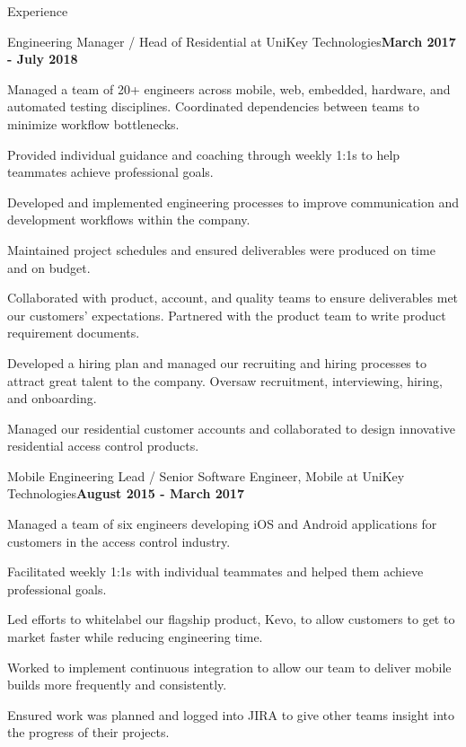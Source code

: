 \documentclass{resume} %
\begin{document}
\begin{rSection}{Experience}


\begin{rSubsection}{Engineering Manager / Head of Residential at UniKey Technologies}{\bf March 2017 - July 2018}{}{}

\item Managed a team of 20+ engineers across mobile, web, embedded, hardware, and automated testing disciplines. Coordinated dependencies between teams to minimize workflow bottlenecks.
\item Provided individual guidance and coaching through weekly 1:1s to help teammates achieve professional goals.
\item Developed and implemented engineering processes to improve communication and development workflows within the company.
\item Maintained project schedules and ensured deliverables were produced on time and on budget.
\item Collaborated with product, account, and quality teams to ensure deliverables met our customers' expectations. Partnered with the product team to write product requirement documents.
\item Developed a hiring plan and managed our recruiting and hiring processes to attract great talent to the company. Oversaw recruitment, interviewing, hiring, and onboarding.
\item Managed our residential customer accounts and collaborated to design innovative residential access control products.

\end{rSubsection}


\begin{rSubsection}{Mobile Engineering Lead / Senior Software Engineer, Mobile at UniKey Technologies}{\bf August 2015 - March 2017}{}{}

\item Managed a team of six engineers developing iOS and Android applications for customers in the access control industry. 
\item Facilitated weekly 1:1s with individual teammates and helped them achieve professional goals.
\item Led efforts to whitelabel our flagship product, Kevo, to allow customers to get to market faster while reducing engineering time.
\item Worked to implement continuous integration to allow our team to deliver mobile builds more frequently and consistently.
\item Ensured work was planned and logged into JIRA to give other teams insight into the progress of their projects.


\end{rSubsection}
\end{rSection}
\end{document}
